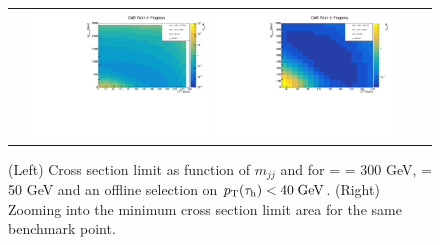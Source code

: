 \begin{figure}[tbh!]
	\centering
	\begin{tabular}{cc}
		\includegraphics[width=0.45\textwidth]{analysis/pics/JetInvMass_vs_MET_xsec_chi300_lsp050_taupt40.pdf}
		\includegraphics[width=0.45\textwidth]{analysis/pics/JetInvMass_vs_MET_xsec_chi300_lsp050_taupt40_zoom.pdf}
	\end{tabular}
	\caption{(Left) Cross section limit as function of $m_{jj}$ and \met for \charginopm = \neutralinotwo = 300 GeV, \neutralinoone = 50 GeV and an offline selection on $p_{\text{T}}(\tau_{\text{h}}) <  40\;\text{Ge}\kern-0.06667em\text{V}$. (Right) Zooming into the minimum cross section limit area for the same benchmark point.}
	\label{fig::JetInvMass_vs_MET_xsec_chi300_lsp050_taupt40}
\end{figure}

